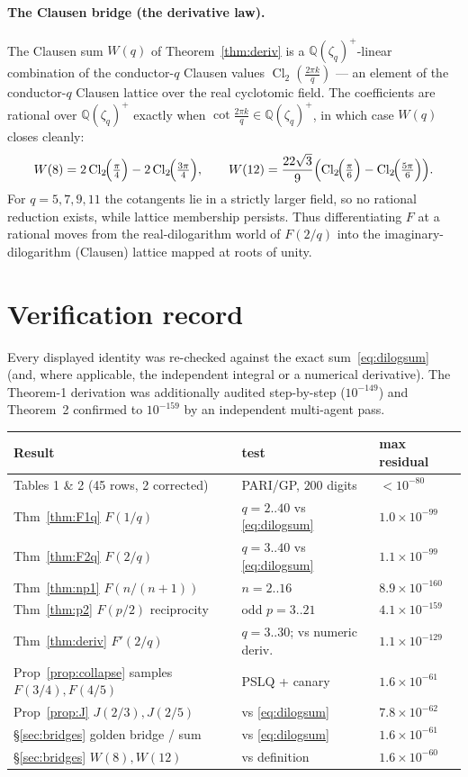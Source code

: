 \documentclass[11pt]{article}
\newcommand{\Cl}{\operatorname{Cl}_2}
\theoremstyle{plain}\newtheorem{theorem}{Theorem}\newtheorem{proposition}[theorem]{Proposition}
\theoremstyle{remark}\newtheorem{remark}[theorem]{Remark}
\begin{document}
\paragraph{The Clausen bridge (the derivative law).} The Clausen sum $W(q)$ of Theorem~\ref{thm:deriv} is a
$\mathbb Q(\zeta_q)^+$-linear combination of the conductor-$q$ Clausen values $\Cl(\tfrac{2\pi k}q)$ --- an
element of the conductor-$q$ Clausen lattice over the real cyclotomic field. The coefficients are rational
over $\mathbb Q(\zeta_q)^+$ exactly when $\cot\tfrac{2\pi k}q\in\mathbb Q(\zeta_q)^+$, in which case $W(q)$
closes cleanly:
\[
  W(8)=2\Cl\!\Bigl(\tfrac{\pi}4\Bigr)-2\Cl\!\Bigl(\tfrac{3\pi}4\Bigr),\qquad
  W(12)=\frac{22\sqrt3}{9}\Bigl(\Cl\!\Bigl(\tfrac{\pi}6\Bigr)-\Cl\!\Bigl(\tfrac{5\pi}6\Bigr)\Bigr).
\]
For $q=5,7,9,11$ the cotangents lie in a strictly larger field, so no rational reduction exists, while
lattice membership persists. Thus differentiating $F$ at a rational moves from the real-dilogarithm world of
$F(2/q)$ into the imaginary-dilogarithm (Clausen) lattice mapped at roots of unity.

\section{Verification record}\label{sec:verif}
Every displayed identity was re-checked against the exact sum~\eqref{eq:dilogsum} (and, where applicable, the
independent integral or a numerical derivative). The Theorem-1 derivation was additionally audited
step-by-step ($10^{-149}$) and Theorem~2 confirmed to $10^{-159}$ by an independent multi-agent pass.

\begin{center}\small
\begin{tabular}{lll}
\toprule
Result & test & max residual \\
\midrule
Tables 1 \& 2 (45 rows, 2 corrected) & PARI/GP, $200$ digits & $<10^{-80}$ \\
Thm~\ref{thm:F1q} $F(1/q)$ & $q=2..40$ vs \eqref{eq:dilogsum} & $1.0\times10^{-99}$ \\
Thm~\ref{thm:F2q} $F(2/q)$ & $q=3..40$ vs \eqref{eq:dilogsum} & $1.1\times10^{-99}$ \\
Thm~\ref{thm:np1} $F(n/(n+1))$ & $n=2..16$ & $8.9\times10^{-160}$ \\
Thm~\ref{thm:p2} $F(p/2)$ reciprocity & odd $p=3..21$ & $4.1\times10^{-159}$ \\
Thm~\ref{thm:deriv} $F'(2/q)$ & $q=3..30$; vs numeric deriv. & $1.1\times10^{-129}$ \\
Prop~\ref{prop:collapse} samples $F(3/4),F(4/5)$ & PSLQ + canary & $1.6\times10^{-61}$ \\
Prop~\ref{prop:J} $J(2/3),J(2/5)$ & vs \eqref{eq:dilogsum} & $7.8\times10^{-62}$ \\
\S\ref{sec:bridges} golden bridge / sum & vs \eqref{eq:dilogsum} & $1.6\times10^{-61}$ \\
\S\ref{sec:bridges} $W(8),W(12)$ & vs definition & $1.6\times10^{-60}$ \\
\bottomrule
\end{tabular}
\end{center}
\end{document}
